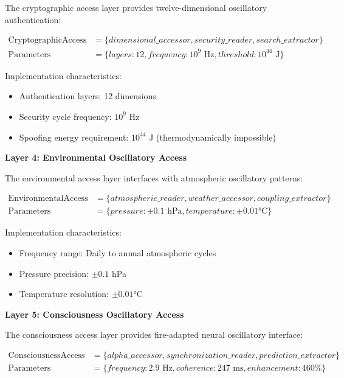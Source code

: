 \documentclass[12pt,a4paper]{article}
\begin{document}
{{{{{{{{{{{{{{The cryptographic access layer provides twelve-dimensional oscillatory authentication:

\begin{align}
\text{CryptographicAccess} &= \{dimensional\_accessor, security\_reader, search\_extractor\} \\
\text{Parameters} &= \{layers: 12, frequency: 10^9 \text{ Hz}, threshold: 10^{44} \text{ J}\}
\end{align}

Implementation characteristics:
\begin{itemize}
\item Authentication layers: 12 dimensions
\item Security cycle frequency: $10^9$ Hz
\item Spoofing energy requirement: $10^{44}$ J (thermodynamically impossible)
\end{itemize}

\textbf{Layer 4: Environmental Oscillatory Access}

The environmental access layer interfaces with atmospheric oscillatory patterns:

\begin{align}
\text{EnvironmentalAccess} &= \{atmospheric\_reader, weather\_accessor, coupling\_extractor\} \\
\text{Parameters} &= \{pressure: \pm 0.1 \text{ hPa}, temperature: \pm 0.01°\text{C}\}
\end{align}

Implementation characteristics:
\begin{itemize}
\item Frequency range: Daily to annual atmospheric cycles
\item Pressure precision: $\pm 0.1$ hPa
\item Temperature resolution: $\pm 0.01$°C
\end{itemize}

\textbf{Layer 5: Consciousness Oscillatory Access}

The consciousness access layer provides fire-adapted neural oscillatory interface:

\begin{align}
\text{ConsciousnessAccess} &= \{alpha\_accessor, synchronization\_reader, prediction\_extractor\} \\
\text{Parameters} &= \{frequency: 2.9 \text{ Hz}, coherence: 247 \text{ ms}, enhancement: 460\%\}
\end{align}

}}}}}}}}}}}}}}
\end{document}
